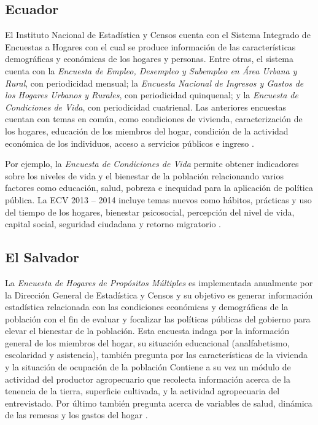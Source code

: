 \documentclass[
  12pt,
]{book}
\begin{document}
\hypertarget{ecuador}{%
\subsection{Ecuador}\label{ecuador}}

El Instituto Nacional de Estadística y Censos cuenta con el Sistema Integrado de Encuestas a Hogares con el cual se produce información de las características demográficas y económicas de los hogares y personas. Entre otras, el sistema cuenta con la \emph{Encuesta de Empleo, Desempleo y Subempleo en Área Urbana y Rural}, con periodicidad mensual; la \emph{Encuesta Nacional de Ingresos y Gastos de los Hogares Urbanos y Rurales}, con periodicidad quinquenal; y la \emph{Encuesta de Condiciones de Vida}, con periodicidad cuatrienal. Las anteriores encuestas cuentan con temas en común, como condiciones de vivienda, caracterización de los hogares, educación de los miembros del hogar, condición de la actividad económica de los individuos, acceso a servicios públicos e ingreso \citep{INEC-EC}.

Por ejemplo, la \emph{Encuesta de Condiciones de Vida} permite obtener indicadores sobre los niveles de vida y el bienestar de la población relacionando varios factores como educación, salud, pobreza e inequidad para la aplicación de política pública. La ECV 2013 -- 2014 incluye temas nuevos como hábitos, prácticas y uso del tiempo de los hogares, bienestar psicosocial, percepción del nivel de vida, capital social, seguridad ciudadana y retorno migratorio \citep{INEC2-EC}.

\hypertarget{el-salvador}{%
\subsection{El Salvador}\label{el-salvador}}

La \emph{Encuesta de Hogares de Propósitos Múltiples} es implementada anualmente por la Dirección General de Estadística y Censos y su objetivo es generar información estadística relacionada con las condiciones económicas y demográficas de la población con el fin de evaluar y focalizar las políticas públicas del gobierno para elevar el bienestar de la población. Esta encuesta indaga por la información general de los miembros del hogar, su situación educacional (analfabetismo, escolaridad y asistencia), también pregunta por las características de la vivienda y la situación de ocupación de la población Contiene a su vez un módulo de actividad del productor agropecuario que recolecta información acerca de la tenencia de la tierra, superficie cultivada, y la actividad agropecuaria del entrevistado. Por último también pregunta acerca de variables de salud, dinámica de las remesas y los gastos del hogar \citep{DIGESTYC-SV}.
\end{document}
